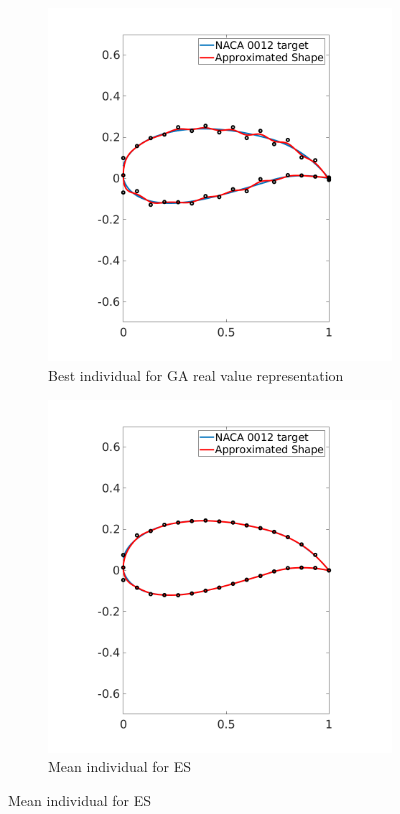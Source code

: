\documentclass{article}
\begin{document}
\begin{itemize}
\begin{itemize}
\begin{figure}[http]
				\begin{subfigure}[b]{.50\linewidth}
					\includegraphics[scale=0.3]{img/GA_wing3_real.png}
					\caption{Best individual for GA real value representation}\label{fig:tiger}
				\end{subfigure}
				\hspace{2mm}
				\begin{subfigure}[b]{.45\linewidth}
					\includegraphics[scale = 0.3]{img/ES_wing3_mean.png}
					\caption{Mean individual for ES  \label{fig:xxx1}}
					

\end{subfigure}
\end{figure}
\end{itemize}
\end{itemize}
\end{document}
